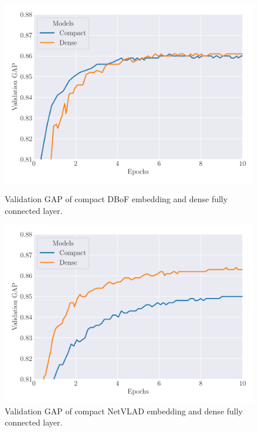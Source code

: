 \begin{figure}[H]
	\center
	\includegraphics[width=\scalefigure\textwidth]{figures/appendix/ap2-training_video_classification/graph_fc_circulant_embedding_dbof}
	\caption{Validation GAP of compact DBoF embedding and dense fully connected layer.}
	\label{figure:ap2-validation_gap_compact_dbof}
	\vspace{1cm}
	\includegraphics[width=\scalefigure\textwidth]{figures/appendix/ap2-training_video_classification/graph_fc_circulant_embedding_netvlad}
	\caption{Validation GAP of compact NetVLAD embedding and dense fully connected layer.}
	\label{figure:ap2-validation_gap_compact_netvlad}
\end{figure}

